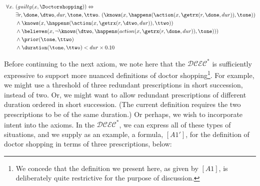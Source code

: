 
\begin{footnotesize}
\begin{align*}
[A1] \ \forall x . \ &(guilty(x, \Doctorshopping)) \Leftrightarrow \\
	& \exists r, \done, \dtwo, dur, \tone, \ttwo . \ (\knows(x,\happens(\action(x, \getrx(r, \done, dur)), \tone)) \\
	& \wedge \knows(x,\happens(\action(x,\getrx(r,\dtwo,dur)),\ttwo)) \\
	& \wedge \believes(x,\neg\knows(\dtwo,\happens(action(x,\getrx(r,\done,dur)),\tone))) \\
	& \wedge \prior(\tone, \ttwo) \\
	& \wedge \duration(\tone, \ttwo) < dur \times 0.10
\end{align*}
\end{footnotesize}

Before continuing to the next axiom, we note here that the $\mathcal{DCEC}^\ast$ is sufficiently expressive to support more nuanced definitions of doctor shopping\footnote{We concede that the definition we present here, as given by $[A1]$, is deliberately quite restrictive for the purpose of discussion.}.  For example, we might use a threshold of three redundant prescriptions in short succession, instead of two.  Or, we might want to allow redundant prescriptions of different duration ordered in short succession. (The current definition requires the two prescriptions to be of the same duration.)  Or perhaps, we wish to incorporate intent into the axioms.  In the $\mathcal{DCEC}^\ast$, we can express all of these types of situations, and we supply as an example, a formula, $[A1']$, for the definition of doctor shopping in terms of three prescriptions, below:

